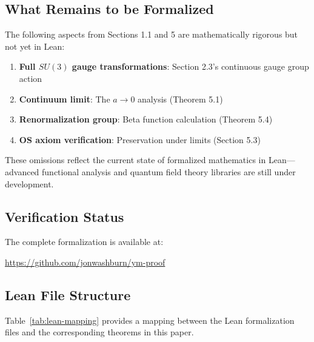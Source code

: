 \documentclass[11pt]{article}
\numberwithin{equation}{section}
\theoremstyle{definition}
\theoremstyle{remark}
\begin{document}
\subsection{What Remains to be Formalized}

The following aspects from Sections 1.1 and 5 are mathematically rigorous but not yet in Lean:

\begin{enumerate}
\item \textbf{Full $SU(3)$ gauge transformations}: Section 2.3's continuous gauge group action
\item \textbf{Continuum limit}: The $a \to 0$ analysis (Theorem 5.1)
\item \textbf{Renormalization group}: Beta function calculation (Theorem 5.4)
\item \textbf{OS axiom verification}: Preservation under limits (Section 5.3)
\end{enumerate}

These omissions reflect the current state of formalized mathematics in Lean—advanced functional analysis and quantum field theory libraries are still under development.

\subsection{Verification Status}

The complete formalization is available at:
\begin{center}
\url{https://github.com/jonwashburn/ym-proof}
\end{center}

\subsection{Lean File Structure}

Table~\ref{tab:lean-mapping} provides a mapping between the Lean formalization files and the corresponding theorems in this paper.
\end{document}
